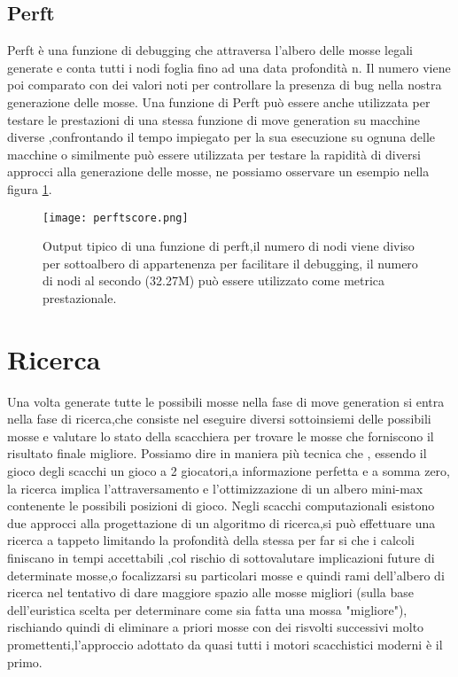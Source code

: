 \subsection{Perft}
Perft è una funzione di debugging che attraversa l'albero delle mosse legali generate e conta tutti i nodi foglia fino ad una data profondità n.
Il numero viene poi comparato con dei valori noti per controllare la presenza di bug nella nostra generazione delle mosse.
Una funzione di Perft può essere anche utilizzata per testare le prestazioni di una stessa funzione di move generation su macchine diverse ,confrontando il tempo impiegato per la sua esecuzione su ognuna delle macchine
o similmente può essere utilizzata per testare la rapidità di diversi approcci alla generazione delle mosse, ne possiamo osservare un esempio nella figura \ref{perftscore}.


\begin{figure}[H]
    \centering
    \texttt{[image: perftscore.png]}
    \caption{Output tipico di una funzione di perft,il numero di nodi viene diviso per sottoalbero di appartenenza per facilitare il debugging, il numero di nodi al secondo (32.27M) può essere utilizzato come metrica prestazionale.}
    \label{perftscore}
\end{figure}


\section{Ricerca} \label{ricerca}
Una volta generate tutte le possibili mosse nella fase di move generation si entra nella fase di ricerca,che consiste nel eseguire diversi sottoinsiemi delle possibili mosse e valutare
lo stato della scacchiera per trovare le mosse che forniscono il risultato finale migliore. Possiamo dire in maniera più tecnica che , essendo il gioco degli scacchi un gioco
a 2 giocatori,a informazione perfetta e a somma zero, la ricerca implica l'attraversamento e l'ottimizzazione di un albero mini-max contenente le possibili posizioni di gioco.
Negli scacchi computazionali esistono due approcci alla progettazione di un algoritmo di ricerca,si può effettuare una ricerca a tappeto limitando la profondità
della stessa per far si che i calcoli finiscano in tempi accettabili ,col rischio di sottovalutare implicazioni future di determinate mosse,o focalizzarsi su particolari mosse e quindi
rami dell'albero di ricerca nel tentativo di dare maggiore spazio alle mosse migliori (sulla base dell'euristica scelta per determinare come sia fatta una mossa "migliore"), rischiando
quindi di eliminare a priori mosse con dei risvolti successivi molto promettenti,l'approccio adottato da quasi tutti i motori scacchistici moderni è il primo.

